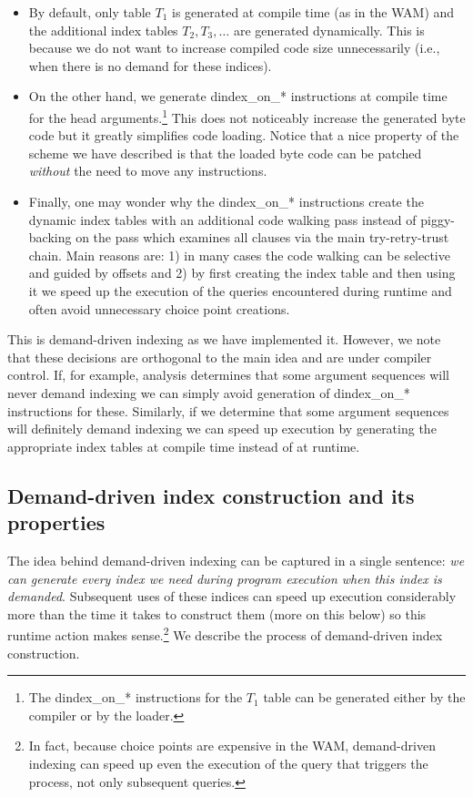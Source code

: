 \documentclass{llncs}
\newcommand{\instr}[1]{\textsf{#1}}
\newcommand{\TryRetryTrust}{\mbox{\instr{try-retry-trust}}\xspace}
\newcommand{\jitiSTAR}{\mbox{\instr{dindex\_on\_*}}\xspace}
\newcommand{\JITI}{demand-driven indexing\xspace}
\begin{document}
\begin{itemize}
\item By default, only table $T_1$ is generated at compile time (as in
  the WAM) and the additional index tables $T_2, T_3, \ldots$ are
  generated dynamically. This is because we do not want to increase
  compiled code size unnecessarily (i.e., when there is no demand for
  these indices).
\item On the other hand, we generate \jitiSTAR instructions at compile
  time for the head arguments.\footnote{The \jitiSTAR instructions for
  the $T_1$ table can be generated either by the compiler or by the
  loader.} This does not noticeably increase the generated byte code
  but it greatly simplifies code loading. Notice that a nice property
  of the scheme we have described is that the loaded byte code can be
  patched \emph{without} the need to move any instructions.
\item Finally, one may wonder why the \jitiSTAR instructions create
  the dynamic index tables with an additional code walking pass
  instead of piggy-backing on the pass which examines all clauses via
  the main \TryRetryTrust chain. Main reasons are: 1) in many cases
  the code walking can be selective and guided by offsets and 2) by
  first creating the index table and then using it we speed up the
  execution of the queries encountered during runtime and often avoid
  unnecessary choice point creations.
\end{itemize}
This is \JITI as we have implemented it.
However, we note that these decisions are orthogonal to the main idea
and are under compiler control. If, for example, analysis determines
that some argument sequences will never demand indexing we can simply
avoid generation of \jitiSTAR instructions for these. Similarly, if we
determine that some argument sequences will definitely demand indexing
we can speed up execution by generating the appropriate index tables
at compile time instead of at runtime.

\subsection{Demand-driven index construction and its properties}
The idea behind \JITI can be captured in a single sentence: \emph{we
can generate every index we need during program execution when this
index is demanded}. Subsequent uses of these indices can speed up
execution considerably more than the time it takes to construct them
(more on this below) so this runtime action makes sense.\footnote{In
fact, because choice points are expensive in the WAM, \JITI can speed
up even the execution of the query that triggers the process, not only
subsequent queries.}
%
We describe the process of demand-driven index construction.
\end{document}

